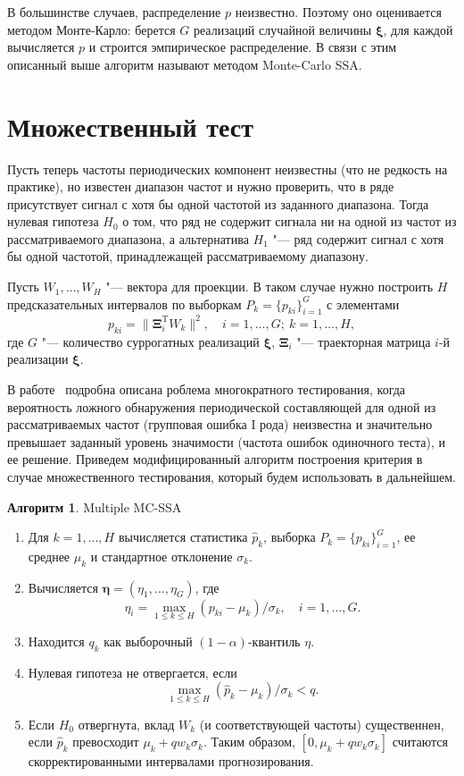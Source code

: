 \documentclass[specialist,
substylefile = spbu_report.rtx,
subf,href,colorlinks=true, 12pt]{disser}
\newcommand{\transponse}{^\mathrm{T}}
\theoremstyle{definition}
\newtheorem{algorithm}{Алгоритм}
\begin{document}
	В большинстве случаев, распределение $p$ неизвестно. Поэтому оно оценивается методом Монте-Карло: берется $G$ реализаций случайной величины $\boldsymbol\xi$, для каждой вычисляется $p$ и строится эмпирическое распределение. В связи с этим описанный выше алгоритм называют методом Monte-Carlo SSA. 
	\section{Множественный тест}
	Пусть теперь частоты периодических компонент неизвестны (что не редкость на практике), но известен диапазон частот и нужно проверить, что в ряде присутствует сигнал с хотя бы одной частотой из заданного диапазона. Тогда нулевая гипотеза $H_0$ о том, что ряд не содержит сигнала ни на одной из частот из рассматриваемого диапазона, а альтернатива $H_1$ "--- ряд содержит сигнал с хотя бы одной частотой, принадлежащей рассматриваемому диапазону.
	
	Пусть $W_1,\ldots,W_H$ "--- вектора для проекции. В таком случае нужно построить $H$ предсказательных интервалов по выборкам $P_k=\{p_{ki}\}_{i=1}^G$ с элементами
	\begin{equation}
		p_{ki}=\|\mathbf{\Xi}_i\transponse W_k\|^2,\quad i=1,\ldots,G;\ k=1,\ldots,H,
	\end{equation}
	где $G$ "--- количество суррогатных реализаций $\boldsymbol{\xi}$, $\mathbf{\Xi}_i$ "--- траекторная матрица $i$-й реализации $\boldsymbol{\xi}$. 
	
	В работе~\cite{golyandina2021detection} подробна описана роблема многократного тестирования, когда вероятность ложного обнаружения периодической составляющей для одной из рассматриваемых частот (групповая ошибка I рода) неизвестна и значительно превышает заданный уровень значимости (частота ошибок одиночного теста), и ее решение. Приведем модифицированный алгоритм построения критерия в случае множественного тестирования, который будем использовать в дальнейшем.
	\begin{algorithm}{Multiple MC-SSA~\cite{golyandina2021detection}}
	\begin{enumerate}
		\item Для $k=1,\dots,H$ вычисляется статистика $\widehat{p}_k$, выборка $P_k=\{p_{ki}\}_{i=1}^G$, ее среднее $\mu_k$ и стандартное отклонение $\sigma_k$.
		\item Вычисляется $\mathbf{\eta}=(\eta_1,\dots,\eta_G)$, где
		\[
		\eta_i=\max_{1\leqslant k\leqslant H}(p_{ki}-\mu_k)/\sigma_k,\quad i=1,\dots,G.
		\]
		\item Находится $q_k$ как выборочный $(1-\alpha)$-квантиль $\eta$.
		\item Нулевая гипотеза не отвергается, если
		\[
		\max_{1\leqslant k\leqslant H}(\widehat{p}_k-\mu_k)/\sigma_k<q.
		\]
		\item Если $H_0$ отвергнута, вклад $W_k$ (и соответствующей частоты) существеннен, если $\widehat{p}_k$ превосходит $\mu_k+qw_k\sigma_k$. Таким образом, $[0,\mu_k+qw_k\sigma_k]$ считаются скорректированными интервалами прогнозирования.
	\end{enumerate}
	\end{algorithm}
\end{document}
